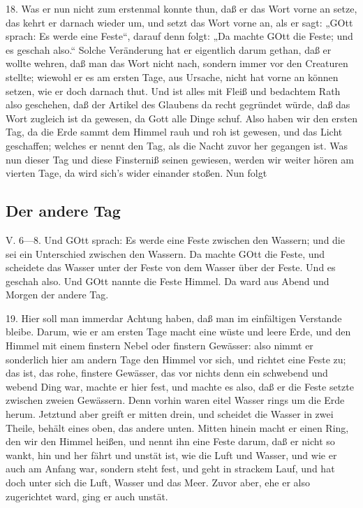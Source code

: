 18. Was er nun nicht zum erstenmal konnte thun, daß er das Wort vorne an setze, das kehrt er darnach wieder um, und setzt das Wort vorne an, als er sagt: „GOtt sprach: Es werde eine Feste“, darauf denn folgt: „Da machte GOtt die Feste; und es geschah also.“ Solche Veränderung hat er eigentlich darum gethan, daß er wollte wehren, daß man das Wort nicht nach, sondern immer vor den Creaturen stellte; wiewohl er es am ersten Tage, aus Ursache, nicht hat vorne an können setzen, wie er doch darnach thut. Und ist alles mit Fleiß und bedachtem Rath also geschehen, daß der Artikel des Glaubens da recht gegründet würde, daß das Wort zugleich ist da gewesen, da Gott alle Dinge schuf. Also haben wir den ersten Tag, da die Erde sammt dem Himmel rauh und roh ist gewesen,
und das Licht geschaffen; welches er nennt den Tag, als die Nacht zuvor her gegangen ist. Was nun dieser Tag und diese Finsterniß seinen gewiesen, werden wir weiter hören am vierten Tage, da wird sich’s wider einander stoßen. Nun folgt

\subsection{Der andere Tag}

\begin{schriftzitat}
V. 6—8. Und GOtt sprach: Es werde eine Feste zwischen den Wassern; und die sei ein Unterschied zwischen den Wassern. Da machte GOtt die Feste, und scheidete das Wasser unter der Feste von dem Wasser über der Feste. Und es geschah also. Und GOtt nannte die Feste Himmel. Da ward aus Abend und Morgen der andere Tag.
\end{schriftzitat}

19. Hier soll man immerdar Achtung haben, daß man im einfältigen Verstande bleibe. Darum, wie er am ersten Tage macht eine wüste und leere Erde, und den Himmel mit einem finstern Nebel oder finstern Gewässer: also nimmt er sonderlich hier am andern Tage den Himmel vor sich, und richtet eine Feste zu; das ist, das rohe, finstere Gewässer, das vor nichts denn ein schwebend und webend Ding war, machte er hier fest, und machte es also, daß er die Feste setzte zwischen zweien Gewässern. Denn vorhin waren eitel Wasser rings um die Erde herum. Jetztund aber greift er mitten drein, und scheidet die Wasser in zwei Theile, behält eines oben, das andere unten. Mitten hinein macht er einen Ring, den wir den Himmel heißen, und nennt ihn eine Feste darum, daß er nicht so wankt, hin und her fährt und unstät ist, wie die Luft und Wasser, und wie er auch am Anfang war, sondern steht fest, und geht in strackem Lauf, und hat doch unter sich die Luft, Wasser und das Meer. Zuvor aber, ehe er also zugerichtet ward, ging er auch unstät.

